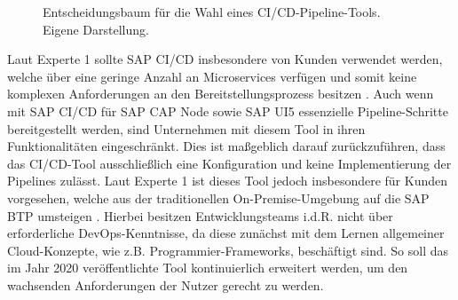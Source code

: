 \begin{center}
	\begin{figure}[H]\hspace*{-11mm}
		\centering
		\caption[Entscheidungsbaum für die Wahl eines CI/CD-Pipeline-Tools]{Entscheidungsbaum für die Wahl eines CI/CD-Pipeline-Tools. Eigene Darstellung.}
		\label{fig:Entscheidungsbaum}
	\end{figure}
\end{center}
\vspace*{-15mm}
Laut Experte 1 sollte SAP CI/CD insbesondere von Kunden verwendet werden, welche über eine geringe Anzahl an Microservices verfügen und somit keine komplexen Anforderungen an den Bereitstellungsprozess besitzen \cite[Z. 58 ff.]{ProductOwnerSAPBTPProd&Infra.}. Auch wenn mit SAP CI/CD für SAP CAP Node sowie SAP UI5 essenzielle Pipeline-Schritte bereitgestellt werden, sind Unternehmen mit diesem Tool in ihren Funktionalitäten eingeschränkt. Dies ist maßgeblich darauf zurückzuführen, dass das CI/CD-Tool ausschließlich eine Konfiguration und keine Implementierung der Pipelines zulässt. 
Laut Experte 1 ist dieses Tool jedoch insbesondere für Kunden vorgesehen, welche aus der traditionellen On-Premise-Umgebung auf die SAP BTP umsteigen \cite[Z. 58 ff.]{ProductOwnerSAPBTPProd&Infra.}. Hierbei besitzen Entwicklungsteams i.d.R. nicht über erforderliche DevOps-Kenntnisse, da diese zunächst mit dem Lernen allgemeiner Cloud-Konzepte, wie z.B. Programmier-Frameworks, beschäftigt sind. So soll das im Jahr 2020 veröffentlichte Tool kontinuierlich erweitert werden, um den wachsenden Anforderungen der Nutzer gerecht zu werden. 
